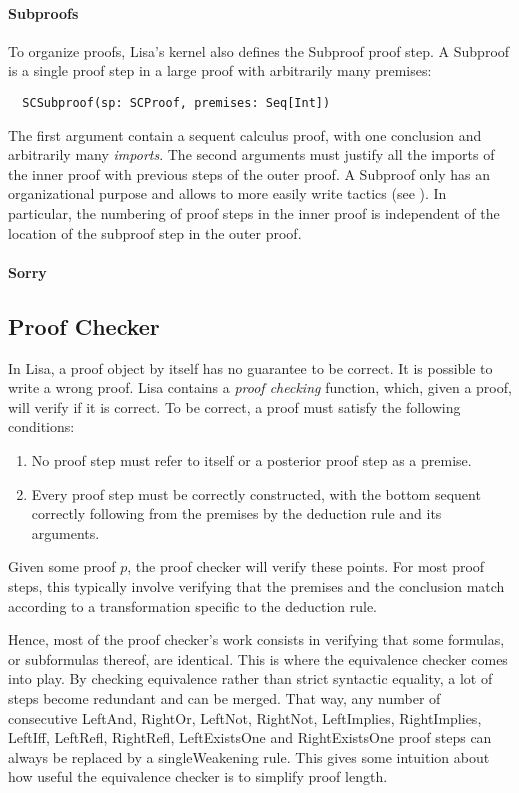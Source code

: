 \paragraph*{Subproofs}
To organize proofs, Lisa's kernel also defines the Subproof proof step. A Subproof is a single proof step in a large proof with arbitrarily many premises:
\begin{lstlisting}
  SCSubproof(sp: SCProof, premises: Seq[Int])
\end{lstlisting}
The first argument contain a sequent calculus proof, with one conclusion and arbitrarily many \textit{imports}. The second arguments must justify all the imports of the inner proof with previous steps of the outer proof.
A Subproof only has an organizational purpose and allows to more easily write tactics (see ). In particular, the numbering of proof steps in the inner proof is independent of the location of the subproof step in the outer proof.

\paragraph*{Sorry}

\subsection{Proof Checker}
\label{subsec:proofchecker}

In Lisa, a proof object by itself has no guarantee to be correct. It is possible to write a wrong proof. Lisa contains a \textit{proof checking} function, which, given a proof, will verify if it is correct. To be correct, a proof must satisfy the following conditions:
\begin{enumerate}
  \item No proof step must refer to itself or a posterior proof step as a premise.
  \item Every proof step must be correctly constructed, with the bottom sequent correctly following from the premises by the deduction rule and its arguments.
\end{enumerate}

Given some proof $p$, the proof checker will verify these points. For most proof steps, this typically involve verifying that the premises and the conclusion match according to a transformation specific to the deduction rule.

Hence, most of the proof checker's work consists in verifying that some formulas, or subformulas thereof, are identical. This is where the equivalence checker comes into play. By checking equivalence rather than strict syntactic equality, a lot of steps become redundant and can be merged. That way,  any number of consecutive {LeftAnd}, {RightOr}, {LeftNot}, {RightNot}, {LeftImplies}, {RightImplies}, {LeftIff}, {LeftRefl}, {RightRefl}, {LeftExistsOne} and  {RightExistsOne} proof steps can always be replaced by a single{Weakening} rule. This gives some intuition about how useful the equivalence checker is to simplify proof length.

